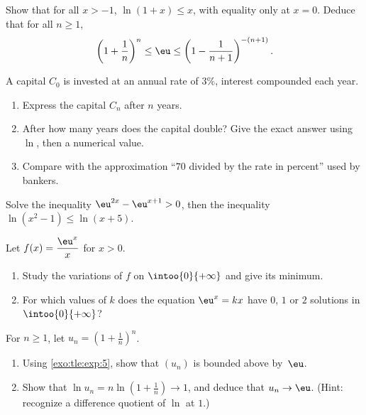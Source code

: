 \begin{exercise}[$\star\star$]\label{exo:tle:exp:5}
Show that for all $x > -1$, $\ln(1 + x) \leq x$, with equality only at
$x = 0$. Deduce that for all $n \geq 1$,
\[
\left(1 + \frac{1}{n}\right)^n \leq \eu \leq \left(1 - \frac{1}{n+1}\right)^{-(n+1)} .
\]
\end{exercise}

\begin{exercise}[$\star\star$]\label{exo:tle:exp:6}
A capital $C_0$ is invested at an annual rate of $3\%$, interest compounded
each year.
\begin{enumerate}
  \item Express the capital $C_n$ after $n$ years.
  \item After how many years does the capital double? Give the exact answer
        using $\ln$, then a numerical value.
  \item Compare with the approximation ``$70$ divided by the rate in
        percent'' used by bankers.
\end{enumerate}
\end{exercise}

\begin{exercise}[$\star\star$]\label{exo:tle:exp:7}
Solve the inequality $\eu^{2x} - \eu^{x+1} > 0$, then the inequality
$\ln(x^2 - 1) \leq \ln(x + 5)$.
\end{exercise}

\begin{exercise}[$\star\star\star$]\label{exo:tle:exp:8}
Let $f(x) = \dfrac{\eu^x}{x}$ for $x > 0$.
\begin{enumerate}
  \item Study the variations of $f$ on $\intoo{0}{+\infty}$ and give its
        minimum.
  \item For which values of $k$ does the equation $\eu^x = kx$ have $0$, $1$
        or $2$ solutions in $\intoo{0}{+\infty}$?
\end{enumerate}
\end{exercise}

\begin{exercise}[$\star\star\star$]\label{exo:tle:exp:9}
For $n \geq 1$, let $u_n = \left(1 + \frac1n\right)^n$.
\begin{enumerate}
  \item Using \cref{exo:tle:exp:5}, show that $(u_n)$ is bounded above
        by~$\eu$.
  \item Show that $\ln u_n = n \ln\left(1 + \frac1n\right) \to 1$, and
        deduce that $u_n \to \eu$.
        (Hint: recognize a difference quotient of $\ln$ at $1$.)
\end{enumerate}
\end{exercise}
